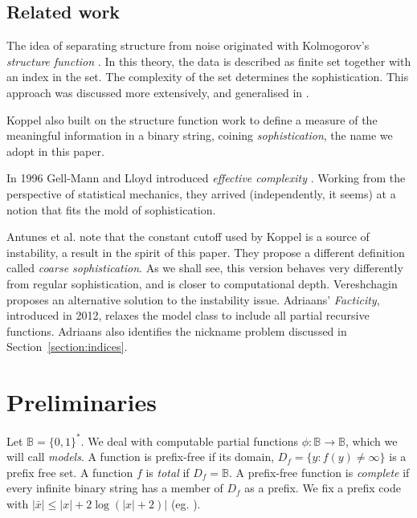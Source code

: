 \documentclass{style/llncs}
\newcommand{\B}{\mathbb B}
\begin{document}
\subsection{Related work}
The idea of separating structure from noise originated with Kolmogorov's \emph{structure function} \cite{cover1985kolmogorov}. In this theory, the data is described as finite set together with an index in the set. The complexity of the set determines the sophistication. This approach was discussed more extensively, and generalised in \cite{vereshchagin2004kolmogorov,gacs2001algorithmic}. 

Koppel \cite{koppelSoph1988,koppel1991almost} also built on the structure function work to define a measure of the meaningful information in a binary string, coining \emph{sophistication}, the name we adopt in this paper. 

In 1996 Gell-Mann and Lloyd introduced \emph{effective complexity} \cite{gellmann1996information}. Working from the perspective of statistical mechanics, they arrived (independently, it seems) at a notion that fits the mold of sophistication.


Antunes et al. \cite{antunes2009sophistication} note that the constant cutoff used by Koppel is a source of instability, a result in the spirit of this paper. They propose a different definition called \emph{coarse sophistication}. As we shall see, this version behaves very differently from regular sophistication, and is closer to computational depth. Vereshchagin \cite{vereshchagin2013algorithmic} proposes an alternative solution to the instability issue. Adriaans' \emph{Facticity}, introduced in 2012\cite{adriaans2012facticity}, relaxes the model class to include all partial recursive functions. Adriaans also identifies the nickname problem discussed in Section~\ref{section:indices}.

\section{Preliminaries}
Let $\B = \{0,1\}^*$. We deal with computable partial functions $\phi: \B \to \B$, which we will call \emph{models}. A function is prefix-free if its domain, $D_f = \{y : f(y) \neq \infty\}$ is a prefix free set. A function $f$ is \emph{total} if $D_f = \B$. A prefix-free function is \emph{complete} if every infinite binary string has a member of $D_f$ as a prefix. We fix a prefix code with $|\bar{x}| \le|x|+2\log(|x|+2)|$ (eg. \cite[Section~1.4]{li1993introduction}).
\end{document}
